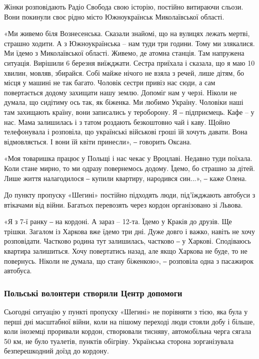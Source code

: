 Жінки розповідають Радіо Свобода свою історію, постійно витираючи сльози. Вони
покинули своє рідно місто Южноукраїнськ Миколаївської області.

«Ми живемо біля Вознесенська. Сказали знайомі, що на вулицях лежать мертві,
страшно ходити. А з Южноукраїнська – нам туди три години. Тому ми злякалися. Ми
їдемо з Миколаївської області. Живемо, де атомна станція. Там напружена
ситуація. Вирішили 6 березня виїжджати. Сестра приїхала і сказала, що я маю 10
хвилин, мовляв, збирайся. Собі майже нічого не взяла з речей, лише дітям, бо
місця у машині не так багато. Чоловік сестри привіз нас сюди, а сам
повертається додому захищати нашу землю. Допоміг нам у черзі. Ніколи не думала,
що сидітиму ось так, як біженка. Ми любимо Україну. Чоловіки наші там захищають
країну, вони записались у тероборону. Я ‒ підприємець. Кафе – у нас. Мама
залишилась і з татом роздають безкоштовно чай і каву. Щойно телефонувала і
розповіла, що українські військові гроші їй хочуть давати. Вона відмовляється.
І вони їй квіти принесли», ‒ говорить Оксана.

«Моя товаришка працює у Польщі і нас чекає у Вроцлаві. Недавно туди поїхала.
Коли стане мирно, то ми одразу повернемось додому. Їдемо, бо страшно за дітей.
Лише життя налагодилося ‒ купили квартиру, народився син...», ‒ каже Олена.


До пункту пропуску «Шегині» постійно підходять люди, під’їжджають автобуси з
втікачами від війни. Багатьох перевозять через кордон організовано зі Львова.

«Я з 7-ї ранку ‒ на кордоні. А зараз – 12-та. Їдемо у Краків до друзів. Ще
трішки. Загалом із Харкова вже їдемо три дні. Дуже довго і важко, навіть не
хочу розповідати. Частково родина тут залишилась, частково ‒ у Харкові.
Сподіваюсь квартира залишиться. Хочу повертатись назад, але якщо Харкова не
буде, то не повернусь. Ніколи не думала, що стану біженкою», ‒ розповіла одна з
пасажирок автобуса.

\subsubsection{Польські волонтери створили Центр допомоги}

Сьогодні ситуацію у пункті пропуску «Шегині» не порівняти з тією, яка була у
перші дні масштабної війни, коли на пішому переході люди стояли добу і більше,
коли іноземці проривали кордон, створювали тисняву, автомобільна черга сягала
50 км, не було туалетів, пунктів обігріву. Українська сторона зорганізувала
безперешкодний доїзд до кордону.

